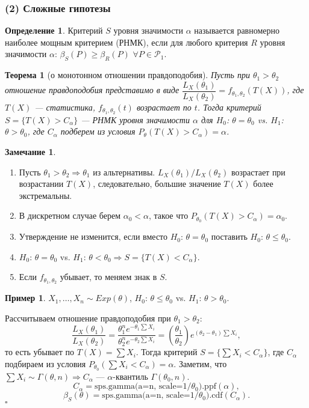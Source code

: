 \documentclass[12pt]{report}
\newenvironment{solution}{{\bfseries Решение:}}{$\square$\\\\}
\newtheorem{theorem}{Теорема}
\theoremstyle{definition}
\newtheorem{definition}{Определение}
\newtheorem{example}{Пример}
\newtheorem{remark}{Замечание}
\begin{document}
\subsubsection{(2) Сложные гипотезы}
\begin{definition}
	Критерий $S$ уровня значимости $\alpha$ называется равномерно наиболее мощным критерием (РНМК), если для любого критерия $R$ уровня значимости $\alpha$: $\beta_S(P) \geqslant \beta_R(P)$ $\forall P \in \mathscr{P}_1$.
\end{definition}
\begin{theorem}[о монотонном отношении правдоподобия]
	Пусть при $\theta_1 > \theta_2$ отношение правдоподобия представимо в виде $\dfrac{L_X(\theta_1)}{L_X(\theta_2)} = f_{\theta_1,\theta_2}(T(X))$, где $T(X)$ — статистика, $f_{\theta_1,\theta_2}(t)$ возрастает по $t$.
	Тогда критерий $S = \{T(X) > C_\alpha\}$ — РНМК уровня значимости $\alpha$ для $H_0$: $\theta = \theta_0$ vs. $H_1$: $\theta > \theta_0$, где $C_\alpha$ подберем из условия $P_\theta(T(X) > C_\alpha) = \alpha$. 
\end{theorem}
\begin{remark}
	$\;$
	\begin{enumerate}
		\item Пусть $\theta_1 > \theta_2 \Rightarrow \theta_1$ из альтернативы. $L_X(\theta_1) / L_X(\theta_2)$ возрастает при возрастании $T(X)$, следовательно, большие значение $T(X)$ более экстремальны.
		\item В дискретном случае берем $\alpha_0 < \alpha$, такое что $P_{\theta_0}(T(X) > C_\alpha) = \alpha_0$.
		\item Утверждение не изменится, если вместо $H_0$: $\theta = \theta_0$ поставить $H_0$: $\theta \leqslant \theta_0$.
		\item $H_0$: $\theta = \theta_0$ vs. $H_1$: $\theta < \theta_0 \Rightarrow S = \{T(X) < C_\alpha\}$.
		\item Если $f_{\theta_1, \theta_2}$ убывает, то меняем знак в $S$. 
	\end{enumerate}
\end{remark}

\begin{example}
	$X_1, \ldots, X_n \sim Exp(\theta)$, $H_0$: $\theta \leqslant \theta_0$ vs. $H_1$: $\theta > \theta_0$.
\end{example}
\begin{solution}
	Рассчитываем отношение правдоподобия при $\theta_1 > \theta_2$:
	$$\dfrac{L_X(\theta_1)}{L_X(\theta_2)} = \dfrac{\theta_1^n e^{-\theta_1 \sum X_i}}{\theta_2^n e^{-\theta_2 \sum X_i}} = \left(\dfrac{\theta_1}{\theta_2}\right)e^{(\theta_2 - \theta_1)\sum X_i},$$
	то есть убывает по $T(X) = \sum X_i$. Тогда критерий $S = \{\sum X_i < C_\alpha\}$, где $C_\alpha$ подбираем из условия $P_{\theta_0}(\sum X_i < C_\alpha) = \alpha$.
	Заметим, что $\sum X_i \sim \Gamma(\theta, n) \Rightarrow C_\alpha$ — $\alpha$-квантиль $\Gamma(\theta_0, n)$.
	$$C_\alpha = \text{sps.gamma(a=n, scale=}1/\theta_0\text{).ppf}(\alpha),$$
	$$\beta_S(\theta) = \text{sps.gamma(a=n, scale=}1/\theta_0\text{).cdf}(C_\alpha).$$
\end{solution}
\end{document}

